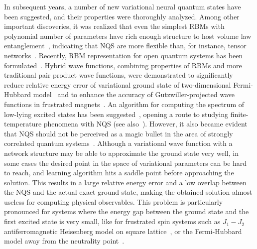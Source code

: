 In subsequent years, a number of new variational neural quantum states have been suggested, and their properties were thoroughly analyzed. Among other important discoveries, it was realized that even the simplest RBMs with polynomial number of parameters have rich enough structure to host volume law entanglement~\cite{Deng,levine2019quantum}, indicating that NQS are more flexible than, for instance, tensor networks~\cite{Orus}. Recently, RBM representation for open quantum systems has been formulated~\cite{torlai2018latent,PhysRevLett.122.250503,PhysRevLett.122.250502}. Hybrid wave functions, combining properties of RBMs and more traditional pair product wave functions, were demonstrated to significantly reduce relative energy error of variational ground state of two-dimensional Fermi-Hubbard model~\cite{Nomura} and to enhance the accuracy of Gutzwiller-projected wave functions in frustrated magnets~\cite{ferrari2019neural}. An algorithm for computing the spectrum of low-lying excited states has been suggested~\cite{Choo}, opening a route to studying finite-temperature phenomena with NQS (see also~\cite{irikura2019neural}). However, it also became evident that NQS should not be perceived as a magic bullet in the area of strongly correlated quantum systems~\cite{park2019geometry}. Although a variational wave function with a network structure may be able to approximate the ground state very well, in some cases the desired point in the space of variational parameters can be hard to reach, and learning algorithm hits a saddle point before approaching the solution. This results in a large relative energy error and a low overlap between the NQS and the actual exact ground state, making the obtained solution almost useless for computing physical observables. This problem is particularly pronounced for systems where the energy gap between the ground state and the first excited state is very small, like for frustrated spin systems such as $J_1-J_2$ antiferromagnetic Heisenberg model on square lattice~\cite{Liang}, or the Fermi-Hubbard model away from the neutrality point~\cite{Luo}.

